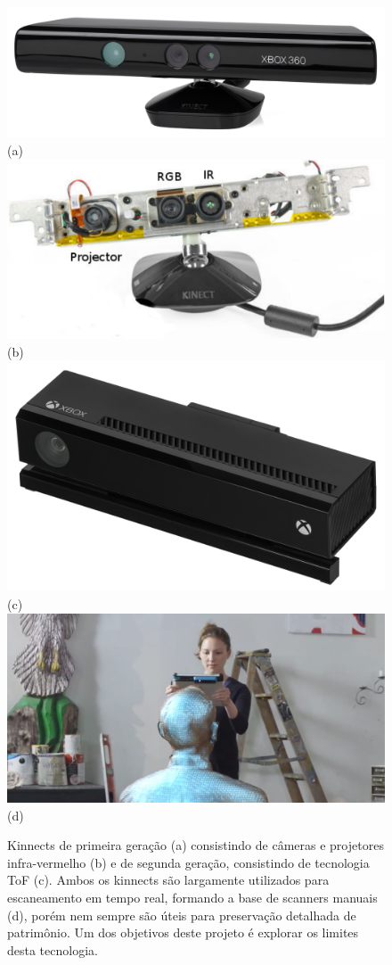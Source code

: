 \begin{figure} [!h]
	\centering
	\includegraphics[width=0.45\linewidth]{figs/Xbox-360-Kinect-Standalone.png}(a)
	\includegraphics[width=0.45\linewidth]{figs/kinect-internals.pdf}(b)
 	\includegraphics[width=0.45\linewidth]{figs/Xbox-One-Kinect.jpg}(c)
 	\includegraphics[width=0.45\linewidth]{figs/kinect-handheld1.png} (d)
	\caption{%
   Kinnects de primeira geração (a) consistindo de câmeras e projetores
   infra-vermelho (b) e de segunda geração, consistindo de tecnologia ToF (c). 
   Ambos os kinnects são largamente utilizados para escaneamento em tempo real, 
   formando a base de scanners manuais (d), porém nem sempre são úteis para 
   preservação detalhada de patrimônio. Um dos objetivos deste
   projeto é explorar os limites desta tecnologia.
	}\label{fig:kinect}
\end{figure}




